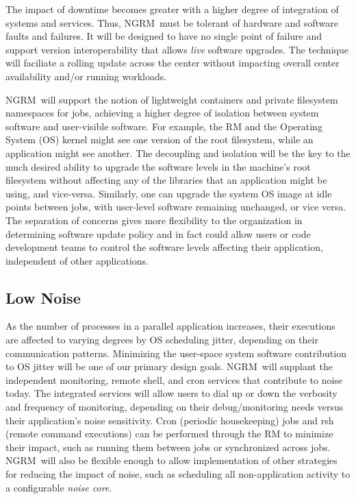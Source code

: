 \documentclass{article}
\newcommand{\ngrm}{NGRM}
\begin{document}
The impact of downtime becomes greater with a higher degree of integration
of systems and services. Thus, \ngrm\ must be tolerant
of hardware and software faults and failures.
It will be designed to have no single point of failure and support 
version interoperability that allows {\em live} software upgrades.
The technique will faciliate a rolling update across the center 
without impacting overall center availability and/or running workloads.

\ngrm\ will support the notion of lightweight containers 
and private filesystem namespaces for jobs, achieving 
a higher degree of isolation between system software and user-visible 
software. For example, the RM and the Operating System (OS)
kernel might see one version of the root filesystem, while an application
might see another. The decoupling and isolation will be the key to the 
much desired ability to upgrade the software levels in the machine's
root filesystem without affecting any of the
libraries that an application might be using, and vice-versa. 
Similarly, one can upgrade the system OS image at idle points between jobs,
with user-level software remaining unchanged, or vice versa. The separation of
concerns gives more flexibility to the organization in determining software
update policy and in fact could allow users or code development teams to
control the software levels affecting their application, independent of
other applications.

\subsection{Low Noise}

As the number of processes in a parallel application increases, 
their executions are affected to varying degrees by OS
scheduling jitter, depending on their communication patterns. Minimizing
the user-space system software contribution to OS jitter will be one 
of our primary design goals.  \ngrm\ will supplant the independent monitoring, 
remote shell, and cron
services that contribute to noise today. The integrated services will
allow users to dial up or down the verbosity and frequency of monitoring,
depending on their debug/monitoring needs versus their application's noise
sensitivity. Cron (periodic housekeeping) jobs and rsh (remote command
executions) can be performed through the RM to minimize their impact,
such as running them between jobs or synchronized across jobs. 
\ngrm\ will also be flexible enough to allow implementation of other
strategies for reducing the impact of noise, such as scheduling all
non-application activity to a configurable {\em noise core}.
\end{document}
